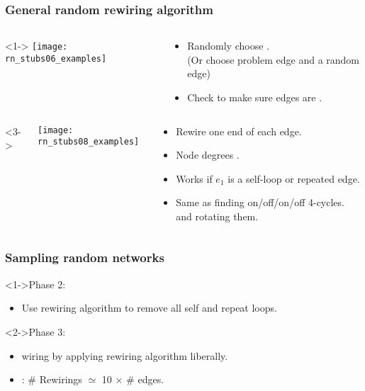\begin{frame}[label=]
  \small

  \frametitle{General random rewiring algorithm}

  \begin{columns}<1->
    \texttt{[image: rn\_stubs06\_examples]}
    \begin{block}{}
      \begin{itemize}
      \item<1-> Randomly choose .\\
        (Or choose problem edge and a random edge)
      \item<2-> Check to make sure edges are .
      \end{itemize}
    \end{block}
  \end{columns}
  \begin{columns}<3->
    \begin{overprint}
      \texttt{[image: rn\_stubs08\_examples]}
    \end{overprint}
    \begin{block}{}
      \begin{itemize}
      \item<3-> Rewire one end of each edge.
      \item<4-> Node degrees .
      \item<5-> Works if $e_1$ is a self-loop or repeated edge.
      \item<6-> Same as finding on/off/on/off 4-cycles.
        and rotating them.
      \end{itemize}
    \end{block}
  \end{columns}
  
\end{frame}

\begin{frame}[label=]
  \frametitle{Sampling random networks}

  \begin{block}<1->{Phase 2:}
    \begin{itemize}
    \item<1-> Use rewiring algorithm to remove
      all self and repeat loops.
    \end{itemize}
  \end{block}  

  \begin{block}<2->{Phase 3:}
    \begin{itemize}
    \item<2->  wiring by applying
      rewiring algorithm liberally.
    \item<3-> :
      \# Rewirings $\simeq$
      10 $\times$ \# edges\cite{milo2003a}.
    \end{itemize}
  \end{block}  
  
\end{frame}


